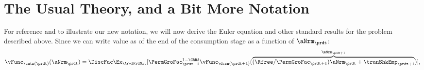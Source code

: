 \documentclass[SolvingMicroDSOPs]{subfiles}
\begin{document}
\hypertarget{the-usual-theory}{}
\section{The Usual Theory, and a Bit More Notation}\label{sec:the-usual-theory}


For reference and to illustrate our new notation, we will now derive the Euler equation and other standard results for the problem described above.
Since we can write value as of the end of the consumption stage as a function of $\aNrm_{\prdt}$:
\hypertarget{eq-vCntnExpansion}{}
\begin{equation}\begin{gathered}\begin{aligned}
  \vFunc_{{\cntn}(\prdt)}(\aNrm_{\prdt}) = \DiscFac \Ex_{\ArvlPrdNxt}[\PermGroFac_{\prdt+1}^{1-\CRRA}\vFunc_{\dcsn(\prdt+1)}(\overbrace{(\Rfree / \PermGroFac_{\prdt+1})\aNrm_{\prdt} +\tranShkEmp_{\prdt+1}}^{\mNrm_{\prdt+1}})], \label{eq:vCntnExpansion}
\end{aligned}\end{gathered}\end{equation}

\hypertarget{derivative-notation-convention}{}
\end{document}
